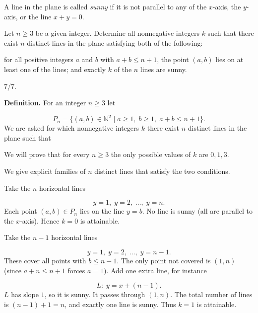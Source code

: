 \begin{mdframed}[style=mdpurplebox,frametitle={IMO 2025 Problem 1}]
A line in the plane is called \emph{sunny}
if it is not parallel to any of the $x$-axis, the $y$-axis, or the line $x+y=0$.

Let $n \ge 3$ be a given integer.
Determine all nonnegative integers $k$ such that there exist $n$ distinct lines
in the plane satisfying both of the following:
\begin{itemize}
\ii for all positive integers $a$ and $b$ with $a+b\le n+1$,
  the point $(a,b)$ lies on at least one of the lines; and
\ii exactly $k$ of the $n$ lines are sunny.
\end{itemize}
\end{mdframed}
\begin{remark*}
  7/7.
\end{remark*}
\textbf{Definition.} For an integer \(n\ge 3\) let\par
\[
P_n = \{(a,b)\in\mathbb{N}^2 \mid a\ge 1,\; b\ge 1,\; a+b\le n+1\}.
\]
We are asked for which nonnegative integers \(k\) there exist \(n\) distinct lines in the plane such that\par
{}
We will prove that for every \(n\ge 3\) the only possible values of \(k\) are \(0,1,3\).\par
\smallskip
{}
We give explicit families of \(n\) distinct lines that satisfy the two conditions.\par
{}
Take the \(n\) horizontal lines\par
\[
y = 1,\; y = 2,\; \dots,\; y = n.
\]
Each point \((a,b)\in P_n\) lies on the line \(y = b\). No line is sunny (all are parallel to the \(x\)-axis). Hence \(k = 0\) is attainable.\par
{}
Take the \(n-1\) horizontal lines\par
\[
y = 1,\; y = 2,\; \dots,\; y = n-1.
\]
These cover all points with \(b \le n-1\). The only point not covered is \((1,n)\) (since \(a+n\le n+1\) forces \(a = 1\)). Add one extra line, for instance\par
\[
L:\; y = x + (n-1).
\]
\(L\) has slope \(1\), so it is sunny. It passes through \((1,n)\). The total number of lines is \((n-1)+1 = n\), and exactly one line is sunny. Thus \(k = 1\) is attainable.\par
